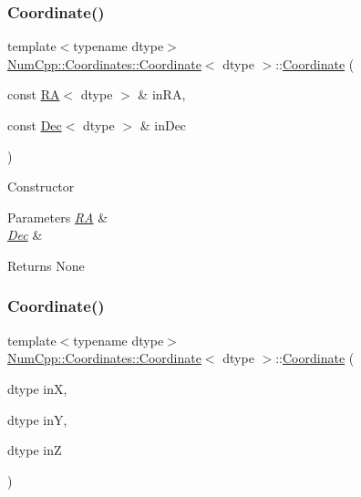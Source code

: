 \subsubsection{\texorpdfstring{Coordinate()}{Coordinate()}\hspace{0.1cm}{\footnotesize\ttfamily [4/6]}}
{\footnotesize\ttfamily template$<$typename dtype$>$ \\
\mbox{\hyperlink{class_num_cpp_1_1_coordinates_1_1_coordinate}{Num\+Cpp\+::\+Coordinates\+::\+Coordinate}}$<$ dtype $>$\+::\mbox{\hyperlink{class_num_cpp_1_1_coordinates_1_1_coordinate}{Coordinate}} (\begin{DoxyParamCaption}\item[{const \mbox{\hyperlink{class_num_cpp_1_1_coordinates_1_1_r_a}{RA}}$<$ dtype $>$ \&}]{in\+RA,  }\item[{const \mbox{\hyperlink{class_num_cpp_1_1_coordinates_1_1_dec}{Dec}}$<$ dtype $>$ \&}]{in\+Dec }\end{DoxyParamCaption})\hspace{0.3cm}{\ttfamily [inline]}}

Constructor


\begin{DoxyParams}{Parameters}
{\em \mbox{\hyperlink{class_num_cpp_1_1_coordinates_1_1_r_a}{RA}}} & \\
\hline
{\em \mbox{\hyperlink{class_num_cpp_1_1_coordinates_1_1_dec}{Dec}}} & \\
\hline
\end{DoxyParams}
\begin{DoxyReturn}{Returns}
None 
\end{DoxyReturn}
\mbox{\label{class_num_cpp_1_1_coordinates_1_1_coordinate_ab8599520ca046b0c97647ffeeec6b80f}} 
\subsubsection{\texorpdfstring{Coordinate()}{Coordinate()}\hspace{0.1cm}{\footnotesize\ttfamily [5/6]}}
{\footnotesize\ttfamily template$<$typename dtype$>$ \\
\mbox{\hyperlink{class_num_cpp_1_1_coordinates_1_1_coordinate}{Num\+Cpp\+::\+Coordinates\+::\+Coordinate}}$<$ dtype $>$\+::\mbox{\hyperlink{class_num_cpp_1_1_coordinates_1_1_coordinate}{Coordinate}} (\begin{DoxyParamCaption}\item[{dtype}]{inX,  }\item[{dtype}]{inY,  }\item[{dtype}]{inZ }\end{DoxyParamCaption})\hspace{0.3cm}{\ttfamily [inline]}}

